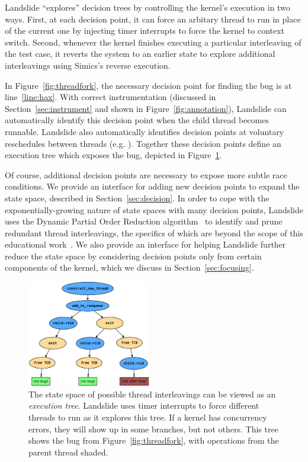 Landslide ``explores'' decision trees by controlling the kernel's execution in two ways.
First, at each decision point, it can force an arbitary thread to run in place of the current one by injecting timer interrupts to force the kernel to context switch.
Second, whenever the kernel finishes executing a particular interleaving of the test case, it reverts the system to an earlier state to explore additional interleavings using Simics's reverse execution.

In Figure~\ref{fig:threadfork}, the necessary decision point for finding the bug is at line~\ref{line:hax}. With correct instrumentation (discussed in Section~\ref{sec:instrument} and shown in Figure~\ref{fig:annotation}), Landslide can automatically identify this decision point when the child thread becomes runnable.
Landslide also automatically identifies decision points at voluntary reschedules between threads (e.g. ). Together these decision points define an execution tree which exposes the bug, depicted in Figure~\ref{fig:tree}.

Of course, additional decision points are necessary to expose more subtle race conditions. We provide an interface for adding new decision points to expand the state space, described in Section~\ref{sec:decision}.
In order to cope with the exponentially-growing nature of state spaces with many decision points,
Landslide uses the Dynamic Partial Order Reduction algorithm~\cite{dpor} to identify and prune redundant thread interleavings, the specifics of which are beyond the scope of this educational work~\cite{landslide}.
We also provide an interface for helping Landslide further reduce the state space by considering decision points only from certain components of the kernel, which we discuss in Section~\ref{sec:focusing}.

\begin{figure}[t]
\includegraphics[width=0.48\textwidth]{threadfork/threadfork.pdf}
\caption{The state space of possible thread interleavings can be viewed as an {\em execution tree}.
Landslide uses timer interrupts to force different threads to run as it explores this tree.
If a kernel has concurrency errors, they will show up in some branches, but not others.
This tree shows the bug from Figure~\ref{fig:threadfork}, with operations from the parent thread shaded.
}
\label{fig:tree}
\end{figure}


